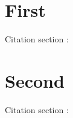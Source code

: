 \documentclass{article}
\begin{document}
\section{First}
\begin{refsection}
Citation section \thesection: \cite{knuth1986texbook}
\printbibliography[heading=subbibliography]
\end{refsection}
\section{Second}
\begin{refsection}
Citation section \thesection: \cite{knuth1977fast}
\printbibliography[heading=subbibliography]
\end{refsection}
\end{document}
